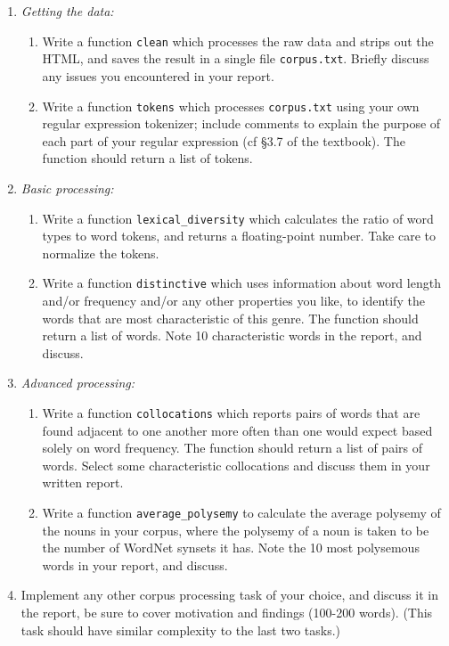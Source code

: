 \documentclass[a4paper]{article}
\begin{document}
\begin{enumerate}
\item \emph{Getting the data:}
\begin{enumerate}
\item Write a function \verb|clean| which processes the raw data and
strips out the HTML, and saves the result in a single file \verb|corpus.txt|.
Briefly discuss any issues you encountered in your report.
\item Write a function \verb|tokens| which processes \verb|corpus.txt|
using your own regular expression tokenizer; include comments to explain
the purpose of each part of your regular expression (cf \S 3.7 of the textbook).
The function should return a list of tokens.
\end{enumerate}
\item \emph{Basic processing:}
\begin{enumerate}
\item Write a function \verb|lexical_diversity| which calculates the ratio
of word types to word tokens, and returns a floating-point number.  Take care
to normalize the tokens.
\item Write a function \verb|distinctive| which uses information about word
length and/or frequency and/or any other properties you like, to identify the
words that are most characteristic of this genre.  The function should return a
list of words.  Note 10 characteristic words in the report, and discuss.
\end{enumerate}
\item \emph{Advanced processing:}
\begin{enumerate}
\item Write a function \verb|collocations| which reports pairs of words that are
found adjacent to one another more often than one would expect based
solely on word frequency.
The function should return a list of pairs of words.
Select some characteristic collocations and discuss them in your written report.
\item Write a function \verb|average_polysemy| to calculate the average polysemy
of the nouns in your corpus, where the polysemy of a noun is taken to be the number of WordNet
synsets it has.  Note the 10 most polysemous words in your report, and discuss.
\end{enumerate}
\item Implement any other corpus processing task of your choice, and discuss
it in the report, be sure to cover motivation and findings (100-200 words).
(This task should have similar complexity to the last two tasks.)
\end{enumerate}
\end{document}
